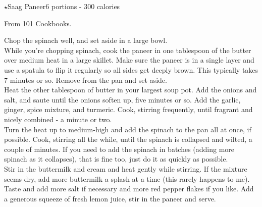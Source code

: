 \begin{recipe}{\texorpdfstring{$\star$}{str}Saag Paneer}{6 portions - 300 calories}{}

    \freeform From 101 Cookbooks.


    Chop the spinach well, and set aside in a large bowl.\\

    While you're chopping spinach, cook the paneer in one tablespoon of the butter over medium heat in a large skillet. Make sure the paneer is in a single layer and use a spatula to flip it regularly so all sides get deeply brown. This typically takes 7 minutes or so. Remove from the pan and set aside.\\

    Heat the other tablespoon of butter in your largest soup pot. Add the onions and salt, and saute until the onions soften up, five minutes or so. Add the garlic, ginger, spice mixture, and turmeric. Cook, stirring frequently, until fragrant and nicely combined - a minute or two.\\

    Turn the heat up to medium-high and add the spinach to the pan all at once, if possible. Cook, stirring all the while, until the spinach is collapsed and wilted, a couple of minutes. If you need to add the spinach in batches (adding more spinach as it collapses), that is fine too, just do it as quickly as possible.\\

    Stir in the buttermilk and cream and heat gently while stirring. If the mixture seems dry, add more buttermilk a splash at a time (this rarely happens to me). Taste and add more salt if necessary and more red pepper flakes if you like. Add a generous squeeze of fresh lemon juice, stir in the paneer and serve.

\end{recipe}